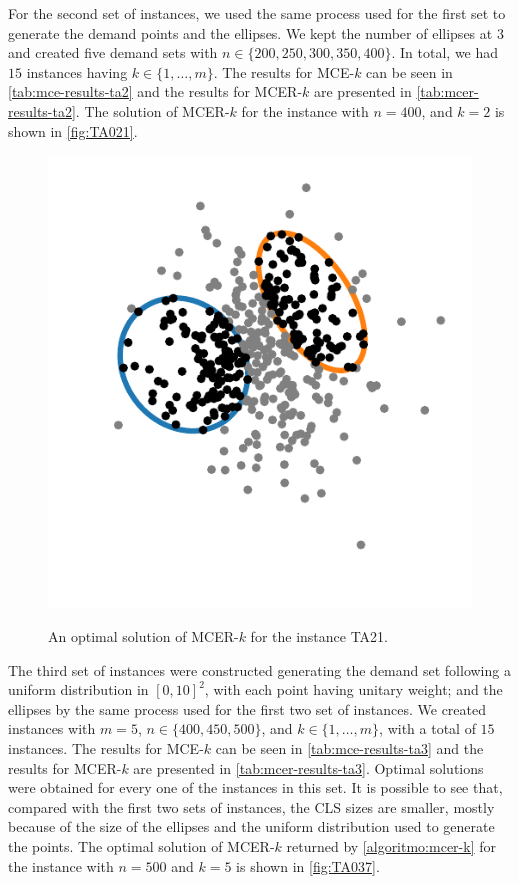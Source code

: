 For the second set of instances, we used the same process used for the first set to generate the demand points and the ellipses. We kept the number of ellipses at $3$ and created five demand sets with $n\in\{200, 250, 300, 350, 400\}$. In total, we had $15$ instances having $k\in\{1, \dots, m\}$. The results for MCE-$k$ can be seen in \autoref{tab:mce-results-ta2} and the results for MCER-$k$ are presented in \autoref{tab:mcer-results-ta2}. The solution of MCER-$k$ for the instance with $n=400$, and $k=2$ is shown in \autoref{fig:TA021}.

\begin{figure}[H]
	\centering
	\caption{An optimal solution of MCER-$k$ for the instance TA21.}
	\includegraphics[scale=.8]{tex/figures/TA021}
	\fautor
	\label{fig:TA021}
\end{figure}

The third set of instances were constructed generating the demand set following a uniform distribution in $[0, 10]^2$, with each point having unitary weight; and the ellipses by the same process used for the first two set of instances. We created instances with $m=5$, $n\in \{400, 450, 500\}$, and $k\in\{1, \dots, m\}$, with a total of $15$ instances. The results for MCE-$k$ can be seen in \autoref{tab:mce-results-ta3} and the results for MCER-$k$ are presented in \autoref{tab:mcer-results-ta3}. Optimal solutions were obtained for every one of the instances in this set. It is possible to see that, compared with the first two sets of instances, the CLS sizes are smaller, mostly because of the size of the ellipses and the uniform distribution used to generate the points. The optimal solution of MCER-$k$ returned by \autoref{algoritmo:mcer-k} for the instance with $n=500$ and $k=5$ is shown in \autoref{fig:TA037}.


